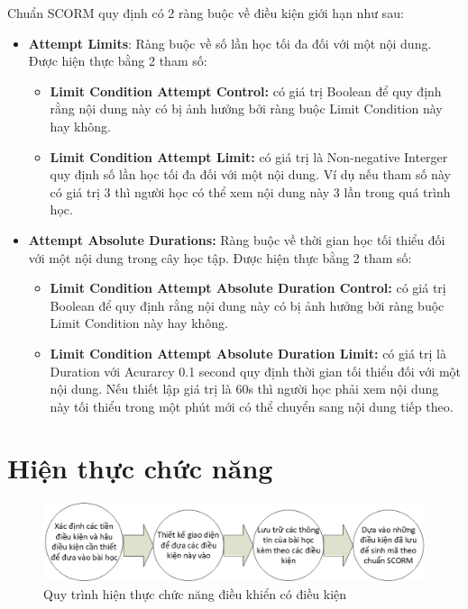	Chuẩn SCORM quy định có 2 ràng buộc về điều kiện giới hạn như sau:
	
	\begin{itemize}
		\item \textbf{Attempt Limits}: Ràng buộc về số lần học tối đa đối với một nội dung. Được hiện thực bằng 2 tham số: 
			\begin{itemize}
				\item \textbf{Limit Condition Attempt Control:} có giá trị Boolean để quy định rằng nội dung này có bị ảnh hưởng bởi ràng buộc Limit Condition này hay không. 
				
				\item \textbf{Limit Condition Attempt Limit:} có giá trị là Non-negative Interger quy định số lần học tối đa đối với một nội dung. Ví dụ nếu tham số này có giá trị 3 thì người học có thể xem nội dung này 3 lần trong quá trình học.
				
			\end{itemize}
			
		\item \textbf{Attempt Absolute Durations:} Ràng buộc về thời gian học tối thiểu đối với một nội dung trong cây học tập. Được hiện thực bằng 2 tham số: 
			\begin{itemize}
	
				\item \textbf{Limit Condition Attempt Absolute Duration Control:} có giá trị Boolean để quy định rằng nội dung này có bị ảnh hưởng bởi ràng buộc Limit Condition này hay không. 
				
				\item \textbf{Limit Condition Attempt Absolute Duration Limit:} có giá trị là Duration với Acurarcy 0.1 second quy định thời gian tối thiểu đối với một nội dung. Nếu thiết lập giá trị là 60s thì người học phải xem nội dung này tối thiểu trong một phút mới có thể chuyển sang nội dung tiếp theo.

			\end{itemize}
		
	\end{itemize}
	
	\newpage
	

\section{Hiện thực chức năng}


		\begin{center}
	\begin{figure}[htp]
		\begin{center}
			\includegraphics[width=15cm]{Chapter3/Pictures/picture310.png}
		\end{center}
		\caption{Quy trình hiện thực chức năng điều khiển có điều kiện}
		\label{refpicture413}
	\end{figure}
\end{center}


